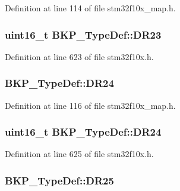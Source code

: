 Definition at line 114 of file stm32f10x\+\_\+map.\+h.

\subsubsection[{\texorpdfstring{D\+R23}{DR23}}]{ {\bf uint16\+\_\+t} B\+K\+P\+\_\+\+Type\+Def\+::\+D\+R23}\hypertarget{struct_b_k_p___type_def_a81ae6732bea9b86ebdad14e13e2fafcf}{}\label{struct_b_k_p___type_def_a81ae6732bea9b86ebdad14e13e2fafcf}


Definition at line 623 of file stm32f10x.\+h.

\subsubsection[{\texorpdfstring{D\+R24}{DR24}}]{ B\+K\+P\+\_\+\+Type\+Def\+::\+D\+R24}\hypertarget{struct_b_k_p___type_def_a2cce18ae4ae9da8685ab78d1bbce005a}{}\label{struct_b_k_p___type_def_a2cce18ae4ae9da8685ab78d1bbce005a}


Definition at line 116 of file stm32f10x\+\_\+map.\+h.

\subsubsection[{\texorpdfstring{D\+R24}{DR24}}]{ {\bf uint16\+\_\+t} B\+K\+P\+\_\+\+Type\+Def\+::\+D\+R24}\hypertarget{struct_b_k_p___type_def_ad3797fc4d32046aef5680ddd0d890368}{}\label{struct_b_k_p___type_def_ad3797fc4d32046aef5680ddd0d890368}


Definition at line 625 of file stm32f10x.\+h.

\subsubsection[{\texorpdfstring{D\+R25}{DR25}}]{ B\+K\+P\+\_\+\+Type\+Def\+::\+D\+R25}\hypertarget{struct_b_k_p___type_def_a1f9e2b4ab84743fc6b2e6dee02fad2dd}{}\label{struct_b_k_p___type_def_a1f9e2b4ab84743fc6b2e6dee02fad2dd}


